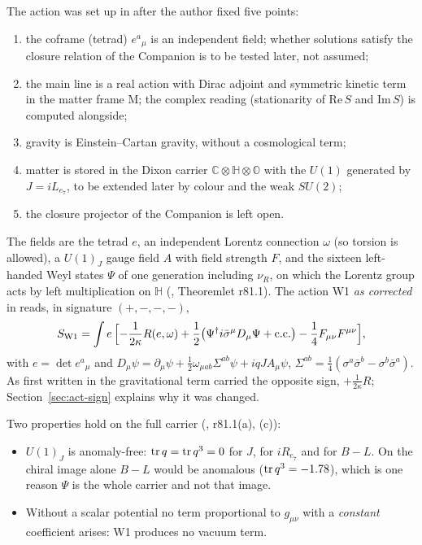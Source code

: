The action was set up in  after the author fixed five points:
\begin{enumerate}
\item the coframe (tetrad) $e^a{}_\mu$ is an independent field; whether solutions satisfy the closure relation of the
  Companion is to be tested later, not assumed;
\item the main line is a real action with Dirac adjoint and symmetric kinetic term in the matter frame M; the complex
  reading (stationarity of $\mathrm{Re}\,S$ and $\mathrm{Im}\,S$) is computed alongside;
\item gravity is Einstein--Cartan gravity, without a cosmological term;
\item matter is stored in the Dixon carrier $\mathbb C\otimes\mathbb H\otimes\mathbb O$ \cite{Dixon1994} with the $U(1)$
  generated by $J=iL_{e_7}$, to be extended later by colour and the weak $SU(2)$;
\item the closure projector of the Companion is left open.
\end{enumerate}
The fields are the tetrad $e$, an independent Lorentz connection $\omega$ (so torsion is allowed), a $U(1)_J$ gauge field
$A$ with field strength $F$, and the sixteen left-handed Weyl states $\Psi$ of one generation including $\nu_R$, on which
the Lorentz group acts by left multiplication on $\mathbb H$ (, Theoremlet r81.1). The action W1 \emph{as
corrected} in  reads, in signature $(+,-,-,-)$,
\begin{equation}
S_{\mathrm{W1}}=\int e\,\Bigl[-\frac1{2\kappa}R(e,\omega)
  +\frac12\bigl(\Psi^\dagger i\bar\sigma^\mu D_\mu\Psi+\mathrm{c.c.}\bigr)-\frac14F_{\mu\nu}F^{\mu\nu}\Bigr],
\label{eq:act-W1}
\end{equation}
with $e=\det e^a{}_\mu$ and
$D_\mu\psi=\partial_\mu\psi+\tfrac12\omega_{\mu ab}\Sigma^{ab}\psi+iqJA_\mu\psi$,
$\Sigma^{ab}=\tfrac14(\sigma^a\bar\sigma^b-\sigma^b\bar\sigma^a)$. As first written in  the gravitational term
carried the opposite sign, $+\frac1{2\kappa}R$; Section~\ref{sec:act-sign} explains why it was changed.

Two properties hold on the full carrier (, r81.1(a), (c)):
\begin{itemize}
\item $U(1)_J$ is anomaly-free: $\operatorname{tr} q=\operatorname{tr} q^3=0$ for $J$, for $iR_{e_7}$ and for $B-L$. On the chiral image alone $B-L$
  would be anomalous ($\operatorname{tr} q^3=-1.78$), which is one reason $\Psi$ is the whole carrier and not that image.
\item Without a scalar potential no term proportional to $g_{\mu\nu}$ with a \emph{constant} coefficient arises: W1
  produces no vacuum term.
\end{itemize}


